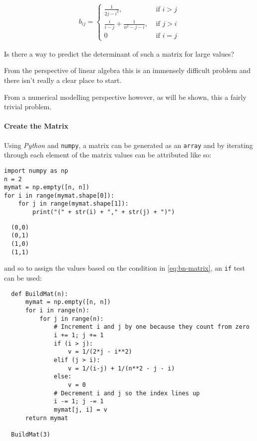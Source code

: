 \documentclass[11pt]{article}
\begin{document}
\begin{align}
b_{ij} = \begin{cases}
\frac{1}{2j- i^2}, &\text{ if } i > j \\
\frac{i}{i- j}+  \frac{1}{n^2- j - i}, &\text{ if } j>i \\
0 &\text{ if } i = j
\end{cases} \label{eq:bn-matrix}
\end{align}

Is there a way to predict the determinant of such a matrix for large values?

From the perspective of linear algebra this is an immensely difficult problem
and there isn't really a clear place to start.

From a numerical modelling perspective however, as will be shown, this a fairly trivial problem.


\paragraph{Create the Matrix}
\label{create-the-matrix}
Using \emph{Python} and \texttt{numpy}, a matrix can be generated as an \texttt{array} and by
iterating through each element of the matrix values can be attributed like so:

\begin{verbatim}
import numpy as np
n = 2
mymat = np.empty([n, n])
for i in range(mymat.shape[0]):
    for j in range(mymat.shape[1]):
        print("(" + str(i) + "," + str(j) + ")")
\end{verbatim}

\begin{verbatim}
  (0,0)
  (0,1)
  (1,0)
  (1,1)
\end{verbatim}

and so to assign the values based on the condition in \eqref{eq:bn-matrix}, an
\texttt{if} test can be used:

\begin{verbatim}
  def BuildMat(n):
      mymat = np.empty([n, n])
      for i in range(n):
          for j in range(n):
              # Increment i and j by one because they count from zero
              i += 1; j += 1
              if (i > j):
                  v = 1/(2*j - i**2)
              elif (j > i):
                  v = 1/(i-j) + 1/(n**2 - j - i)
              else:
                  v = 0
              # Decrement i and j so the index lines up
              i -= 1; j -= 1
              mymat[j, i] = v
      return mymat

  BuildMat(3)
\end{verbatim}
\end{document}
